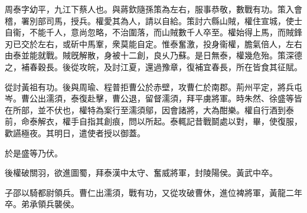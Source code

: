 \begin{pinyinscope}
 
 
 周泰字幼平，九江下蔡人也。與蔣欽隨孫策為左右，服事恭敬，數戰有功。策入會稽，署別部司馬，授兵。權愛其為人，請以自給。策討六縣山賊，權住宣城，使士自衞，不能千人，意尚忽略，不治圍落，而山賊數千人卒至。權始得上馬，而賊鋒刃已交於左右，或斫中馬鞌，衆莫能自定。惟泰奮激，投身衞權，膽氣倍人，左右由泰並能就戰。賊旣解散，身被十二創，良乆乃蘇。是日無泰，權幾危殆。策深德之，補春穀長。後從攻皖，及討江夏，還過豫章，復補宜春長，所在皆食其征賦。
 
 
 
 
 從討黃祖有功。後與周瑜、程普拒曹公於赤壁，攻曹仁於南郡。荊州平定，將兵屯岑。曹公出濡須，泰復赴擊，曹公退，留督濡須，拜平虜將軍。時朱然、徐盛等皆在所部，並不伏也，權特為案行至濡須鄔，因會諸將，大為酣樂。權自行酒到泰前，命泰解衣，權手自指其創痕，問以所起。泰輒記昔戰鬬處以對，畢，使復服，歡讌極夜。其明日，遣使者授以御蓋。
 
 
 於是盛等乃伏。
 
 
 
 
 後權破關羽，欲進圖蜀，拜泰漢中太守、奮威將軍，封陵陽侯。黃武中卒。
 
 
 
 
 子邵以騎都尉領兵。曹仁出濡須，戰有功，又從攻破曹休，進位裨將軍，黃龍二年卒。弟承領兵襲侯。
 
 
\end{pinyinscope}